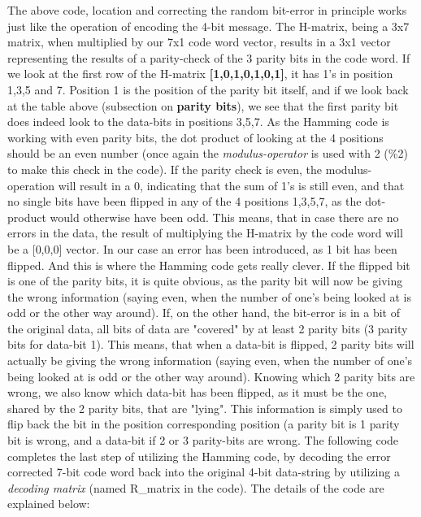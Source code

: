 \documentclass[11pt]{article}
\begin{document}
    The above code, location and correcting the random bit-error in
principle works just like the operation of encoding the 4-bit message.
The H-matrix, being a 3x7 matrix, when multiplied by our 7x1 code word
vector, results in a 3x1 vector representing the results of a
parity-check of the 3 parity bits in the code word. If we look at the
first row of the H-matrix \textbf{{[}1,0,1,0,1,0,1{]}}, it has 1's in
position 1,3,5 and 7. Position 1 is the position of the parity bit
itself, and if we look back at the table above (subsection on
\textbf{parity bits}), we see that the first parity bit does indeed look
to the data-bits in positions 3,5,7. As the Hamming code is working with
even parity bits, the dot product of looking at the 4 positions should
be an even number (once again the \emph{modulus-operator} is used with 2
(\%2) to make this check in the code). If the parity check is even, the
modulus-operation will result in a 0, indicating that the sum of 1's is
still even, and that no single bits have been flipped in any of the 4
positions 1,3,5,7, as the dot-product would otherwise have been odd.
This means, that in case there are no errors in the data, the result of
multiplying the H-matrix by the code word will be a {[}0,0,0{]} vector.
In our case an error has been introduced, as 1 bit has been flipped. And
this is where the Hamming code gets really clever. If the flipped bit is
one of the parity bits, it is quite obvious, as the parity bit will now
be giving the wrong information (saying even, when the number of one's
being looked at is odd or the other way around). If, on the other hand,
the bit-error is in a bit of the original data, all bits of data are
"covered" by at least 2 parity bits (3 parity bits for data-bit 1). This
means, that when a data-bit is flipped, 2 parity bits will actually be
giving the wrong information (saying even, when the number of one's
being looked at is odd or the other way around). Knowing which 2 parity
bits are wrong, we also know which data-bit has been flipped, as it must
be the one, shared by the 2 parity bits, that are "lying". This
information is simply used to flip back the bit in the position
corresponding position (a parity bit is 1 parity bit is wrong, and a
data-bit if 2 or 3 parity-bits are wrong. The following code completes
the last step of utilizing the Hamming code, by decoding the error
corrected 7-bit code word back into the original 4-bit data-string by
utilizing a \emph{decoding matrix} (named R\_matrix in the code). The
details of the code are explained below:
\end{document}
